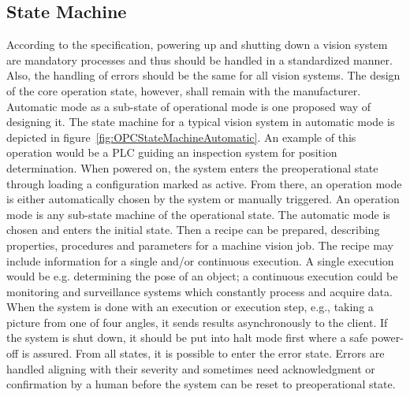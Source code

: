 \subsection{State Machine}
According to the specification, powering up and shutting down a vision system are mandatory processes and thus should be handled in a standardized manner. Also, the handling of errors should be the same for all vision systems. The design of the core operation state, however, shall remain with the manufacturer. Automatic mode as a sub-state of operational mode is one proposed way of designing it. The state machine for a typical vision system in automatic mode is depicted in figure~\ref{fig:OPCStateMachineAutomatic}. An example of this operation would be a PLC guiding an inspection system for position determination. When powered on, the system enters the preoperational state through loading a configuration marked as active. From there, an operation mode is either automatically chosen by the system or manually triggered. An operation mode is any sub-state machine of the operational state. The automatic mode is chosen and enters the initial state. Then a recipe can be prepared, describing properties, procedures and parameters for a machine vision job. The recipe may include information for a single and/or continuous execution. A single execution would be e.g. determining the pose of an object; a continuous execution could be monitoring and surveillance systems which constantly process and acquire data. When the system is done with an execution or execution step, e.g., taking a picture from one of four angles, it sends results asynchronously to the client. If the system is shut down, it should be put into halt mode first where a safe power-off is assured. From all states, it is possible to enter the error state. Errors are handled aligning with their severity and sometimes need acknowledgment or confirmation by a human before the system can be reset to preoperational state.

